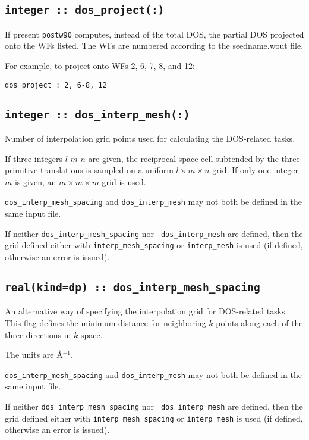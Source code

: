 \subsection[berry\_energy\_step]{\tt integer :: dos\_project(:)}

If present {\tt postw90} computes, instead of the total DOS, the
partial DOS projected onto the WFs listed. The WFs are numbered
according to the seedname.wout file.

For example, to project onto WFs 2, 6, 7, 8, and 12:

{\tt dos\_project : 2, 6-8, 12}


\subsection[boltz\_interp\_mesh]{\tt integer :: dos\_interp\_mesh(:)}
Number of interpolation grid points used for calculating the DOS-related tasks.

If three integers $l$ $m$ $n$ are given, the reciprocal-space cell
subtended by the three primitive translations is sampled on a uniform
$l\times m\times n$ grid.  If only one integer $m$ is given, an
$m\times m\times m$ grid is used.

{\tt dos\_interp\_mesh\_spacing} and {\tt dos\_interp\_mesh} may not
both be defined in the same input file.

If neither {\tt dos\_interp\_mesh\_spacing} nor {\tt
  dos\_interp\_mesh} are defined, then the grid defined either with
{\tt interp\_mesh\_spacing} or {\tt interp\_mesh} is used (if defined,
otherwise an error is issued).

\subsection[boltz\_interp\_mesh\_spacing]{\tt real(kind=dp) :: dos\_interp\_mesh\_spacing}

An alternative way of specifying the interpolation grid for
DOS-related tasks. This flag defines the minimum distance for
neighboring $k$ points along each of the three directions in $k$
space. 

The units are \AA$^{-1}$.

{\tt dos\_interp\_mesh\_spacing} and {\tt dos\_interp\_mesh} may
not both be defined in the same input file.

If neither {\tt dos\_interp\_mesh\_spacing} nor {\tt
  dos\_interp\_mesh} are defined, then the grid defined either with
{\tt interp\_mesh\_spacing} or {\tt interp\_mesh} is used (if defined,
otherwise an error is issued).



